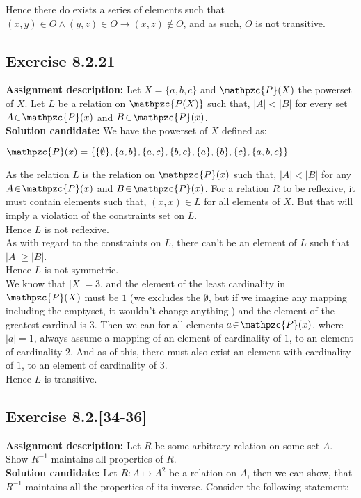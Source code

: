 \documentclass{report}
\newcommand{\cent}[1]{\begin{center}#1\end{center}}
\newcommand{\In}{\! \in \!}
\newcommand{\script}[1]{\mathpzc{#1}}
\newcommand{\assignmentDescription}{\textbf{Assignment description: }}
\newcommand{\solution}{\textbf{Solution candidate: }}
\newcommand{\Exercise}[1]{\subsection{Exercise #1}}
\begin{document}
	 Hence there do exists a series of elements such that $(x,y) \In O \wedge (y,z) \In O \to (x,z) \notin O$, and as such, $O$ is not transitive.
	 
	 \Exercise{8.2.21}
	 
 	\assignmentDescription
 	Let $X=\{a,b,c\}$ and $\script{P}(X)$ the powerset of $X$. Let $L$ be a relation on $\script{P(X)}$ such that, $|A| < |B|$ for every set $A \In \script{P}(x)$ and $B \In \script{P}(x) $.\\

	\solution
	We have the powerset of $X$ defined as:
	
	\cent{$\script{P}(x) = \{\{\emptyset\},\{a,b\},\{a,c\},\{b,c\},\{a\},\{b\},\{c\},\{a,b,c\}\}$}
	
	As the relation $L$ is the relation on $\script{P}(x)$ such that, $|A| < |B|$ for any $A \In \script{P}(x)$ and $B \In \script{P}(x)$. For a relation $R$ to be reflexive, it must contain elements such that, $(x,x) \In L$ for all elements of $X$. But that will imply a violation of the constraints set on $L$.\\
	
	Hence $L$ is not reflexive.\\
	
	As with regard to the constraints on $L$, there can't be an element of $L$ such that $|A| \geq |B| $.\\
	
	Hence $L$ is not symmetric.\\
	
	
	We know that $|X|=3$, and the element of the least cardinality in $\script{P}(X)$ must be $ 1 $ (we excludes the $\emptyset$, but if we imagine any mapping including the emptyset, it wouldn't change anything.) and the element of the greatest cardinal is $3$. Then we can for all elements $a  \In \script{P}(x)$, where $|a| = 1$, always assume a mapping of an element of cardinality of $1$, to an element of cardinality $ 2 $. And as of this, there must also exist an element with cardinality of $1$, to an element of cardinality of $3$.\\
	
	Hence $L$ is transitive.
	
	\Exercise{8.2.[34-36]}
	
	\assignmentDescription
	Let $R$ be some arbitrary relation on some set $A$. Show $R^{-1}$ maintains all properties of $R$.\\
	
	\solution
	Let $R : A \mapsto A^2$ be a relation on $A$, then we can show, that $R^{-1}$ maintains all the properties of its inverse. Consider the following statement:
	
\end{document}
